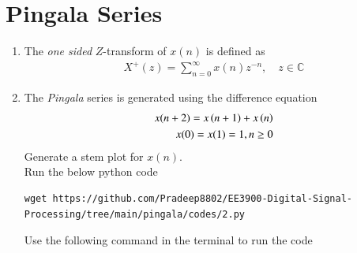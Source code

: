 \documentclass[journal,12pt,twocolumn]{IEEEtran}
\renewcommand\thesection{\arabic{section}}
\begin{document}
\section{Pingala Series}
\begin{enumerate}[label=\thesection.\arabic*,ref=\thesection.\theenumi]
\item The {\em one sided} $Z$-transform of $x(n)$ is defined as 
\begin{align}
	X^{+}(z) = \sum_{n = 0}^{\infty}x(n)z^{-n}, \quad z \in \mathbb{C}
	\label{eq:one-Z}
\end{align}
\item The {\em Pingala} series is generated using the difference equation 
\begin{align}
	x(n+2) = x\left(n+1\right) + x\left(n\right)\\
	x(0) = x(1) = 1, n \ge 0
	\label{eq:xn}
\end{align}
Generate a stem plot for $x(n)$.\\
\solution
Run the below python code 
\begin{lstlisting}
wget https://github.com/Pradeep8802/EE3900-Digital-Signal-Processing/tree/main/pingala/codes/2.py
\end{lstlisting}
Use the following command in the terminal to run the code


\end{enumerate}
\end{document}

